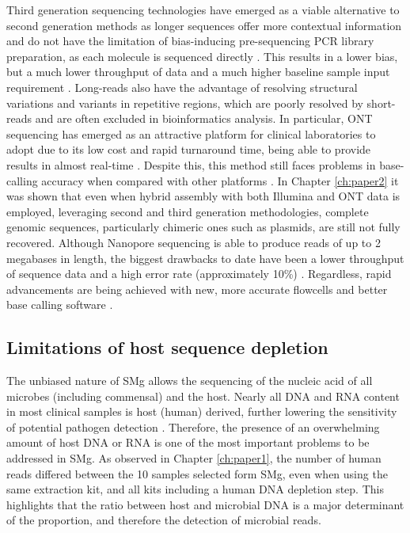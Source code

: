 Third generation sequencing technologies have emerged as a viable alternative to second generation methods as longer sequences offer more contextual information and do not have the limitation of bias-inducing pre-sequencing \ac{PCR} library preparation, as each molecule is sequenced directly \citep{loman_twenty_2015, ari_next-generation_2016}. This results in a lower bias, but a much lower throughput of data and a much higher baseline sample input requirement \citep{gu_clinical_2019}. Long-reads also have the advantage of resolving structural variations and variants in repetitive regions, which are poorly resolved by short-reads and are often excluded in bioinformatics analysis. In particular, \ac{ONT} sequencing has emerged as an attractive platform for clinical laboratories to adopt due to its low cost and rapid turnaround time, being able to provide results in almost real-time \citep{petersen_third-generation_2019}. Despite this, this method still faces problems in base-calling accuracy when compared with other platforms \citep{gu_clinical_2019}. In Chapter \ref{ch:paper2} it was shown that even when hybrid assembly with both Illumina and \ac{ONT} data is employed, leveraging second and third generation methodologies, complete genomic sequences, particularly chimeric ones such as plasmids, are still not fully recovered. Although Nanopore sequencing is able to produce reads of up to 2 megabases in length, the biggest drawbacks to date have been a lower throughput of sequence data and a high error rate (approximately 10\%) \citep{petersen_third-generation_2019}. Regardless, rapid advancements are being achieved with new, more accurate flowcells and better base calling software \citep{sereika_oxford_2021}. 

\subsection{Limitations of host sequence depletion}

The unbiased nature of \ac{SMg} allows the sequencing of the nucleic acid of all microbes (including commensal) and the host. Nearly all \ac{DNA} and \ac{RNA} content in most clinical samples is host (human) derived, further lowering the sensitivity of potential pathogen detection \citep{gu_clinical_2019}. Therefore, the presence of an overwhelming amount of host \ac{DNA} or \ac{RNA} is one of the most important problems to be addressed in \ac{SMg}.
As observed in Chapter \ref{ch:paper1}, the number of human reads differed between the 10 samples selected form \ac{SMg}, even when using the same extraction kit, and all kits including a human DNA depletion step. This highlights that the ratio between host and microbial DNA is a major determinant of the proportion, and therefore the detection of microbial reads.

